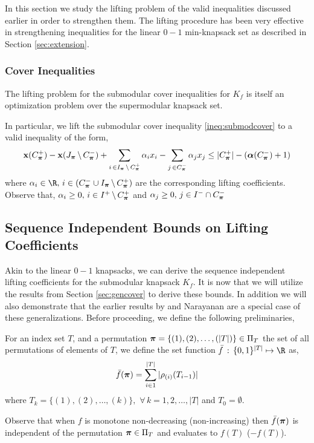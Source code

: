 \documentclass[10pt,twoside]{amsart}
\begin{document}
In this section we study the lifting problem of the valid inequalities discussed earlier in order to strengthen them. The lifting procedure has been very effective in strengthening inequalities for the linear $0-1$ min-knapsack set \cite{Balas1975,Balas1978,Balas1984,Gu1998,Hammer1975,Wolsey1975} as described in Section \ref{sec:extension}.

\subsubsection{Cover Inequalities}\hfill

The lifting problem for the submodular cover inequalities for $K_f$ is itself an optimization problem over the supermodular knapsack set.

In particular, we lift the submodular cover inequality \eqref{ineq:submodcover} to a valid inequality of the form,
\begin{align}
  \label{ineq:liftedsubmodcover}
  \mathbf{x}(C^+_{\boldsymbol\pi})  - \mathbf{x}(J_{\boldsymbol\pi}\,\backslash\, C^-_{\boldsymbol\pi}) + \sum_{i\,\in I_{\boldsymbol\pi}\,\backslash\, C^+_{\boldsymbol\pi}} \alpha_i x_i - \sum_{j\,\in C^-_{\boldsymbol\pi}} \alpha_j x_j \leq |C^+_{\boldsymbol\pi}| - (\boldsymbol\alpha(C^-_{\boldsymbol\pi}) + 1)
\end{align}
where $\alpha_i \in \R,\, i \in ( C^-_{\bpi} \cup I_{\bpi}\sm C^+_{\bpi})$ are the corresponding lifting coefficients. Observe that, $\alpha_i \geq 0,\, i \in I^+\,\backslash\, C^+_{\boldsymbol\pi}$ and $\alpha_j \geq 0,\, j \in I^-\cap C^-_{\boldsymbol\pi}$

\subsection{Sequence Independent Bounds on Lifting Coefficients}\hfill
\label{sec:submodseqind}

Akin to the linear $0-1$ knapsacks, we can derive the sequence independent lifting coefficients for the submodular knapsack $K_f$. It is now that we will utilize the results from Section \ref{sec:gencover} to derive these bounds. In addition we will also demonstrate that the earlier results by \atam and Narayanan \cite{Atamturk2009333} are a special case of these generalizations. Before proceeding, we define the following preliminaries,

\begin{dfn}
  For an index set $T$, and a permutation $\boldsymbol\pi = \{(1),(2),\ldots, (|T|)\} \in \Pi_T$ the set of all permutations of elements of $T$, we define the set function $\bar{f}\,:\,\binset^{|T|} \mapsto \R$ as,
  \begin{align}
    \bar{f}(\boldsymbol\pi) = \sum_{i\in 1}^{|T|} |\rho_{(i)}(T_{i-1})|
  \end{align}
  where $T_k = \{(1), (2), \ldots, (k)\},\,\,\forall\,k = 1,2,\ldots,|T|$ and $T_0 = \emptyset$.
\end{dfn}
Observe that when $f$ is monotone non-decreasing (non-increasing) then $\bar{f}(\boldsymbol\pi)$ is independent of the permutation $\boldsymbol\pi \in \Pi_T$ and evaluates to $f(T)$ ($-f(T)$).
\end{document}
